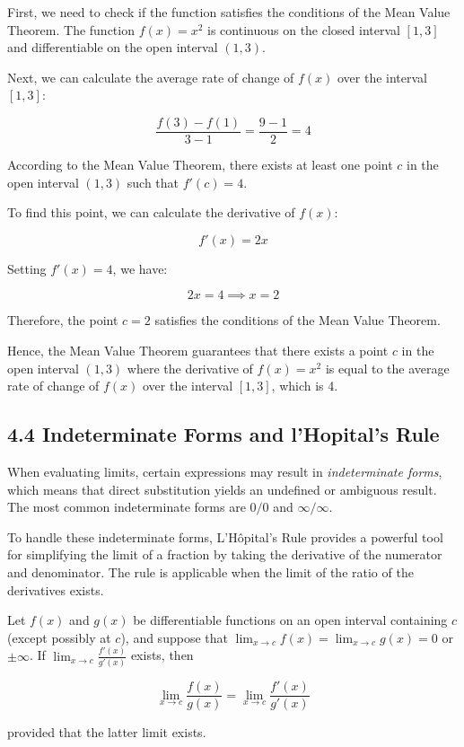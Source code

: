 \documentclass{article}
\begin{document}
First, we need to check if the function satisfies the conditions of the Mean Value Theorem. The function $f(x) = x^2$ is continuous on the closed interval $[1, 3]$ and differentiable on the open interval $(1, 3)$.

Next, we can calculate the average rate of change of $f(x)$ over the interval $[1, 3]$:

\[
\frac{{f(3) - f(1)}}{{3 - 1}} = \frac{{9 - 1}}{{2}} = 4
\]

According to the Mean Value Theorem, there exists at least one point $c$ in the open interval $(1, 3)$ such that $f'(c) = 4$.

To find this point, we can calculate the derivative of $f(x)$:

\[
f'(x) = 2x
\]

Setting $f'(x) = 4$, we have:

\[
2x = 4 \implies x = 2
\]

Therefore, the point $c = 2$ satisfies the conditions of the Mean Value Theorem.

Hence, the Mean Value Theorem guarantees that there exists a point $c$ in the open interval $(1, 3)$ where the derivative of $f(x) = x^2$ is equal to the average rate of change of $f(x)$ over the interval $[1, 3]$, which is 4.

\subsection{4.4 Indeterminate Forms and l'Hopital's Rule}
When evaluating limits, certain expressions may result in \textit{indeterminate forms}, which means that direct substitution yields an undefined or ambiguous result. The most common indeterminate forms are $0/0$ and $\infty/\infty$.

To handle these indeterminate forms, L'Hôpital's Rule provides a powerful tool for simplifying the limit of a fraction by taking the derivative of the numerator and denominator. The rule is applicable when the limit of the ratio of the derivatives exists.


Let $f(x)$ and $g(x)$ be differentiable functions on an open interval containing $c$ (except possibly at $c$), and suppose that $\lim_{x \to c} f(x) = \lim_{x \to c} g(x) = 0$ or $\pm \infty$. If $\lim_{x \to c} \frac{f'(x)}{g'(x)}$ exists, then

\[
\lim_{x \to c} \frac{f(x)}{g(x)} = \lim_{x \to c} \frac{f'(x)}{g'(x)}
\]

provided that the latter limit exists.
\end{document}
